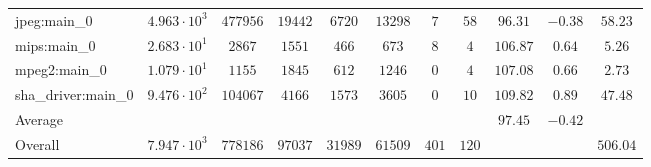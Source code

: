 \begin{tabular}{|l|c|c|c|c|c|c|c|c|c|c|}
jpeg:main\_0            & $ 4.963 \cdot 10^{3} $ & $ 477956 $ & $ 19442 $ & $ 6720  $ & $ 13298 $ & $ 7   $ & $ 58  $ & $ 96.31       $ & $ -0.38   $ & $ 58.23   $ \\
mips:main\_0            & $ 2.683 \cdot 10^{1} $ & $ 2867   $ & $ 1551  $ & $ 466   $ & $ 673   $ & $ 8   $ & $ 4   $ & $ 106.87      $ & $ 0.64    $ & $ 5.26    $ \\
mpeg2:main\_0           & $ 1.079 \cdot 10^{1} $ & $ 1155   $ & $ 1845  $ & $ 612   $ & $ 1246  $ & $ 0   $ & $ 4   $ & $ 107.08      $ & $ 0.66    $ & $ 2.73    $ \\
sha\_driver:main\_0     & $ 9.476 \cdot 10^{2} $ & $ 104067 $ & $ 4166  $ & $ 1573  $ & $ 3605  $ & $ 0   $ & $ 10  $ & $ 109.82      $ & $ 0.89    $ & $ 47.48   $ \\
\hline
Average                 & $                    $ & $        $ & $       $ & $       $ & $       $ & $     $ & $     $ & $ 97.45       $ & $ -0.42   $ & $         $ \\
\hline
Overall                 & $ 7.947 \cdot 10^{3} $ & $ 778186 $ & $ 97037 $ & $ 31989 $ & $ 61509 $ & $ 401 $ & $ 120 $ & $             $ & $         $ & $ 506.04  $ \\
\hline
\end{tabular}
